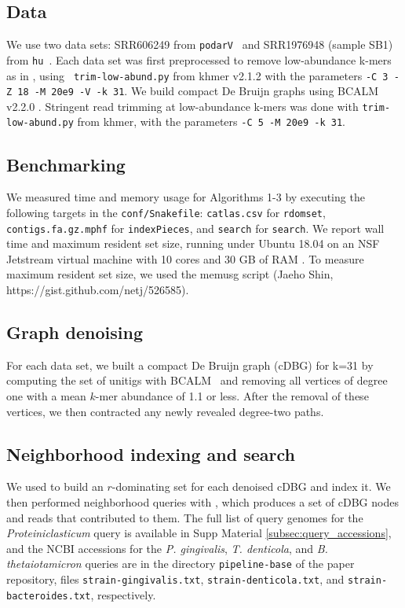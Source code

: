 \subsection*{Data}

We use two data sets: SRR606249 from
\texttt{podarV}~\cite{shakya2013comparative} and SRR1976948 (sample
SB1) from \texttt{hu}~\cite{hu}. Each data set was first preprocessed
to remove low-abundance k-mers as in \cite{Zhang2015}, using {\tt
  trim-low-abund.py} from khmer v2.1.2 \cite{Standage2017} with the
parameters {\tt -C 3 -Z 18 -M 20e9 -V -k 31}. We build compact De Bruijn
graphs using BCALM v2.2.0 \cite{bcalm}.  Stringent read trimming at
low-abundance k-mers was done with {\tt trim-low-abund.py} from khmer, with the
parameters {\tt -C 5 -M 20e9 -k 31}.

\subsection*{Benchmarking}

We measured time and memory usage for Algorithms 1-3 by executing the
following targets in the \sgc \texttt{conf/Snakefile}:
\texttt{catlas.csv} for \texttt{rdomset}, \texttt{contigs.fa.gz.mphf}
for \texttt{indexPieces}, and \texttt{search} for \texttt{search}.  We
report wall time and maximum resident set size, running under Ubuntu
18.04 on an NSF Jetstream virtual machine with 10 cores and 30 GB of
RAM \cite{jetstream1,jetstream2}. To measure maximum resident set
size, we used the memusg script (Jaeho Shin,
https://gist.github.com/netj/526585).

\subsection*{Graph denoising}

For each data set, we built a compact De Bruijn graph (cDBG) for
k=31 by computing the set of unitigs with
BCALM~\cite{chikhi2016compacting} and removing all vertices of degree one
with a mean $k$-mer abundance of 1.1 or less. After the removal of these vertices, we then contracted any newly revealed degree-two paths.

\subsection*{Neighborhood indexing and search}

We used \sgc to build an $r$-dominating set for each denoised cDBG and
index it. We then performed neighborhood queries with \sgc, which
produces a set of cDBG nodes and reads that contributed to them.  The
full list of query genomes for the {\em Proteiniclasticum} query is
  available in Supp Material \ref{subsec:query_accessions}, and
  the NCBI accessions for the {\em P. gingivalis}, {\em T. denticola}, 
and {\em B. thetaiotamicron} queries are in the directory {\tt pipeline-base} 
of the paper repository, files {\tt strain-gingivalis.txt}, 
{\tt strain-denticola.txt}, and {\tt strain-bacteroides.txt}, respectively.

